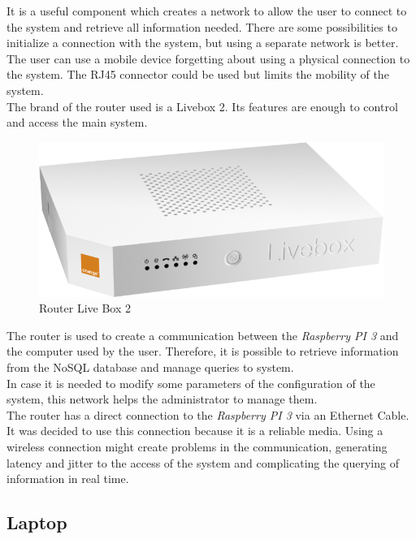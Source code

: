 It is a useful component which creates a network to allow the user to connect to the system and retrieve all information needed. There are some possibilities to initialize a connection with the system, but using a separate network is better. The user can use a mobile device forgetting about using a physical connection to the system. The RJ45 connector could be used but limits the mobility of the system.\\

The brand of the router used is a Livebox 2. Its features are enough to control and access the main system.\\

\begin{figure}[H]
\begin{centering}
\includegraphics[scale=0.3]{IMGS/LIVE_BOX_2.png}
\caption{Router Live Box 2 \label{Live_Box2}}
\end{centering}
\end{figure}

The router is used to create a communication between the \textit{Raspberry PI 3} and the computer used by the user. Therefore, it is possible to retrieve information from the NoSQL database and manage queries to system.\\

In case it is needed to modify some parameters of the configuration of the system, this network helps the administrator to manage them.\\

The router has a direct connection to the \textit{Raspberry PI 3} via an Ethernet Cable. It was decided to use this connection because it is a reliable media. Using a wireless connection might create problems in the communication, generating latency and jitter to the access of the system and complicating the querying of information in real time.

\subsection{Laptop}

